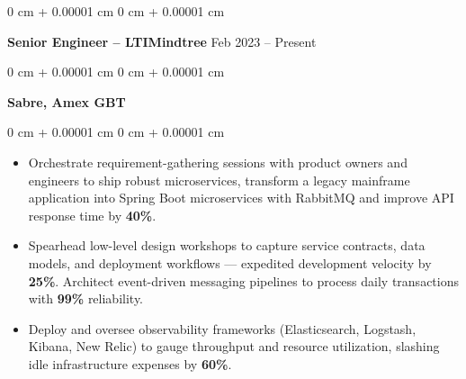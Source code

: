 \documentclass[10pt, letterpaper]{article}
\newenvironment{highlights}{
    \begin{itemize}[
        topsep=0.10 cm,
        parsep=0.10 cm,
        partopsep=0pt,
        itemsep=0pt,
        leftmargin=0 cm + 10pt
    ]
}{
    \end{itemize}
} %
\newenvironment{onecolentry}{
    \begin{adjustwidth}{
        0 cm + 0.00001 cm
    }{
        0 cm + 0.00001 cm
    }
}{
    \end{adjustwidth}
} %
\newenvironment{twocolentry}[2][]{
    \onecolentry
    \def\secondColumn{#2}
    \setcolumnwidth{\fill, 4.5 cm}
    \begin{paracol}{2}
}{
    \switchcolumn \raggedleft \secondColumn
    \end{paracol}
    \endonecolentry
} %
\begin{document}
        \begin{twocolentry}{Feb 2023 – Present}
            \textbf{Senior Engineer – LTIMindtree} \end{twocolentry}
            \begin{onecolentry}
                \textbf{Sabre, Amex GBT}
            \end{onecolentry}
        \vspace{0.10 cm}
        \begin{onecolentry}
            \begin{highlights}
                \item Orchestrate requirement-gathering sessions with product owners and engineers to ship robust microservices, transform a legacy mainframe application into Spring Boot microservices with RabbitMQ and improve API response time by \textbf{40\%}.
                
                
                \item Spearhead low-level design workshops to capture service contracts, data models, and deployment workflows — expedited development velocity by \textbf{25\%}. Architect event-driven messaging pipelines to process daily transactions with \textbf{99\%} reliability. 

                \item Deploy and oversee observability frameworks (Elasticsearch, Logstash, Kibana, New Relic) to gauge throughput and resource utilization, slashing idle infrastructure expenses by \textbf{60\%}.

            \end{highlights}
        \end{onecolentry}
\end{document}
